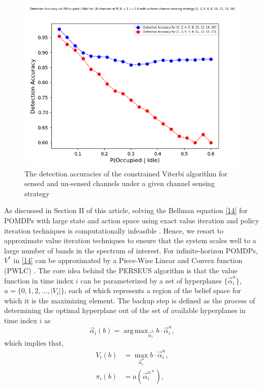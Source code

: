 \documentclass[10pt,twocolumn]{IEEEtran}
\DeclareMathOperator*{\argmax}{arg\,max}
\begin{document}
\begin{figure}
    \centering
    \includegraphics[scale=0.5]{Uniform_Channel_Sensing_1.png}
    \caption{The detection accuracies of the constrained Viterbi algorithm for sensed and un-sensed channels under a given channel sensing strategy}
    \label{fig:4}
\end{figure}
As discussed in Section II of this article, solving the Bellman equation \eqref{14} for POMDPs with large state and action space using exact value iteration and policy iteration techniques \cite{Kaelbling:1998:PAP:1643275.1643301} is computationally infeasible \cite{Pineau:2003:PVI:1630659.1630806}. Hence, we resort to approximate value iteration techniques \cite{Kaelbling:1998:PAP:1643275.1643301} to ensure that the system scales well to a large number of bands in the spectrum of interest. For infinite-horizon POMDPs, $V^*$ in \eqref{14} can be approximated by a Piece-Wise Linear and Convex function (PWLC) \cite{Kaelbling:1998:PAP:1643275.1643301}. The core idea behind the PERSEUS algorithm is that the value function in time index $i$ can be parameterized by a set of hyperplanes $\{\vec{\alpha}_i^{u}\}$, $u = \{0,1,2,\dots,|V_i|\}$, each of which represents a region of the belief space for which it is the maximizing element. The backup step is defined as the process of determining the optimal hyperplane out of the set of available hyperplanes in time index $i$ as
\begin{equation}\label{37}
    \vec{\alpha}_{i}(b) = \argmax_{\vec{\alpha}_{i}^u} b \cdot \vec{\alpha}_{i}^u,
\end{equation}
which implies that,
\begin{equation}\label{38}
    \begin{split}
        V_i(b) &= \max_{\vec{\alpha}_{i}^u} b \cdot \vec{\alpha}_{i}^u,\\
        \pi_i(b) &= a(\vec{\alpha}_i^{u*}),
    \end{split}
\end{equation}
\end{document}
